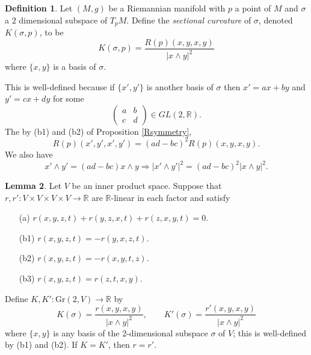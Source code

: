 \documentclass{amsart}
\numberwithin{equation}{section}
\newcommand{\bR}{\mathbb{R}}
\theoremstyle{definition}
\newtheorem{definition}{Definition} [section]
\theoremstyle{theorem}
\newtheorem{lemma}[definition]{Lemma}
\begin{document}
\begin{definition}
Let $(M,g)$ be a Riemannian manifold with $p$ a point of $M$ and $\sigma$ a 2 dimensional subspace of $T_pM$. 
Define the {\em sectional curvature} of $\sigma$, denoted $K(\sigma, p)$, to be 
\[
K(\sigma, p) = \frac{R(p)(x,y,x,y)}{|x \wedge y|^2}
\]
where $\{ x,y \}$ is a basis of $\sigma$. 
\end{definition}

This is well-defined because if $\{ x',y'\}$ is another basis of $\sigma$ then 
$x' = ax + by$ and $y' = cx + dy$ for some 
$$
\left(\begin{array}{cc}a & b\\ c& d\end{array}\right) \in GL(2,\bR).
$$
The by (b1) and (b2) of Proposition \ref{Rsymmetry},
\[
R(p)(x',y',x',y') = (ad - bc)^2 R(p)(x,y,x,y).
\]
We also have
$$
x' \wedge y'  = (ad-bc) x \wedge y \Rightarrow |x'\wedge y'|^2=(ad-bc)^2 |x\wedge y|^2. 
$$ 

\begin{lemma}\label{r-K}
Let $V$ be an inner product space.
Suppose that $r,r' : V \times V \times V \times V \to \bR$ are $\bR$-linear in each factor 
and satisfy 
\begin{enumerate}
\item[(a)] $r(x,y,z,t)+ r(y,z,x,t)+ r(z,x,y,t)=0$.
\item[(b1)] $r(x,y,z,t)=-r(y,x,z,t)$.
\item[(b2)] $r(x,y,z,t)=-r(x,y,t,z)$.
\item[(b3)] $r(x,y,z,t)= r(z,t,x,y)$.
\end{enumerate}

Define $K, K' : \text{Gr}(2,V) \to \bR$ by 
\[
K(\sigma) = \frac{r(x,y,x,y)}{|x \wedge y|^2},\quad \quad K'(\sigma) = \frac{r'(x,y,x,y)}{|x \wedge y|^2}
\]
where $\{x,y\}$ is any basis of the 2-dimensional subspace $\sigma$ of $V$; this is well-defined by
(b1) and (b2). If $K = K'$, then $r = r'$.  
\end{lemma}
\end{document}
